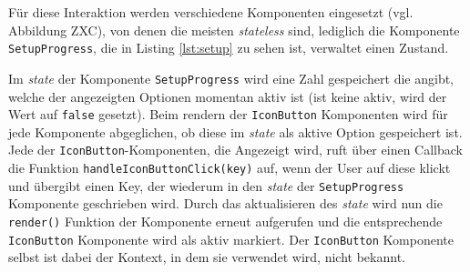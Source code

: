 Für diese Interaktion werden verschiedene Komponenten eingesetzt (vgl. Abbildung ZXC), von denen die meisten \textit{stateless} sind, lediglich die Komponente \verb|SetupProgress|, die in Listing \ref{lst:setup} zu sehen ist\footnotemark{}, verwaltet einen Zustand.


Im \textit{state} der Komponente \verb|SetupProgress| wird eine Zahl gespeichert die angibt, welche der angezeigten Optionen momentan aktiv ist (ist keine aktiv, wird der Wert auf \verb|false| gesetzt). Beim rendern der \verb|IconButton| Komponenten wird für jede Komponente abgeglichen, ob diese im \textit{state} als aktive Option gespeichert ist. Jede der \verb|IconButton|-Komponenten, die Angezeigt wird, ruft über einen Callback die Funktion \verb|handleIconButtonClick(key)| auf, wenn der User auf diese klickt und übergibt einen Key, der wiederum in den \textit{state} der  \verb|SetupProgress| Komponente geschrieben wird. Durch das aktualisieren des \textit{state} wird nun die \verb|render()| Funktion der Komponente erneut aufgerufen und die entsprechende \verb|IconButton| Komponente wird als aktiv markiert.
Der  \verb|IconButton| Komponente selbst ist dabei der Kontext, in dem sie verwendet wird, nicht bekannt.



